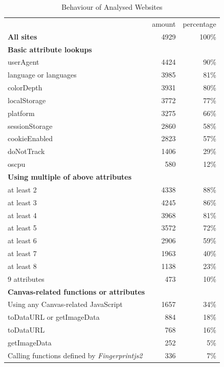 \documentclass[
    fontsize=12pt,
    headings=small,
    parskip=half,
    bibliography=totoc,
    numbers=noenddot,
    open=any
    ]{scrreprt}
\begin{document}
\renewcommand{\arraystretch}{1.2}
\begin{table}
\centering
\caption{Behaviour of Analysed Websites}
\begin{tabular}{l r r}
    \toprule
    & amount & percentage \\
    \textbf{All sites} & 4929 & 100\% \\
    \midrule
    \textbf{Basic attribute lookups} & & \\
    userAgent & 4424 & 90\% \\ %
    language or languages & 3985 & 81\% \\ %
    colorDepth & 3931 & 80\% \\ %
    localStorage & 3772 & 77\% \\
    platform & 3275 & 66\% \\ %
    sessionStorage & 2860 & 58\% \\
    cookieEnabled & 2823 & 57\% \\ %
    doNotTrack & 1406 & 29\% \\ %
    oscpu & 580 & 12\% \\ %
    \midrule
    \textbf{Using multiple of above attributes} & & \\
    at least 2 & 4338 & 88\% \\
    at least 3 & 4245 & 86\% \\
    at least 4 & 3968 & 81\% \\
    at least 5 & 3572 & 72\% \\
    at least 6 & 2906 & 59\% \\
    at least 7 & 1963 & 40\% \\
    at least 8 & 1138 & 23\% \\
    9 attributes & 473 & 10\% \\
    \midrule
    \textbf{Canvas-related functions or attributes} & & \\
    Using any Canvas-related JavaScript & 1657 & 34\% \\ %
    toDataURL or getImageData & 884 & 18\% \\ %
    toDataURL & 768 & 16\% \\ %
    getImageData & 252 & 5\% \\ %
    \midrule
    Calling functions defined by \textit{Fingerprintjs2} & 336 & 7\% \\ %
    \bottomrule
\end{tabular}
\label{table:dataprops}
\end{table}
\end{document}
